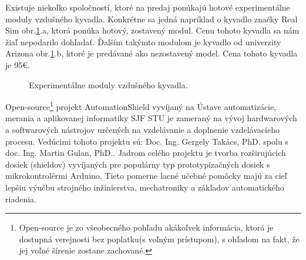 Existuje niekoľko spoločností, ktoré na predaj ponúkajú hotové experimentálne moduly vzdušného kyvadla. Konkrétne sa jedná napríklad o kyvadlo značky Real Sim obr.\ref{OBRAZOK 1.2}.a, ktorá ponúka hotový, zostavený modul. Cenu tohoto kyvadla sa nám žiaľ nepodarilo dohľadať. Ďalším takýmto modulom je kyvadlo od univerzity Arizona\cite{enikov_campa_2012} obr.\ref{OBRAZOK 1.2}.b, ktoré je predávané ako nezostavený model. Cena tohoto kyvadla je 95\euro. 

\begin{figure}[!tbh]
	\hfill
	\hfill
	\hfill
	\caption{Experimentálne moduly vzdušného kyvadla.}\label{OBRAZOK 1.2}
\end{figure}

\newpage
Open-source\footnote[1]{Open-source je zo všeobecného pohľadu akákoľvek informácia, ktorá je dostupná verejnosti bez poplatku(s voľným prístupom), s ohľadom na fakt, že jej voľné šírenie zostane zachované.} projekt AutomationShield vyvíjaný na Ústave automatizácie, merania a aplikovanej informatiky SJF STU je zameraný na vývoj hardwarových a softwarových nástrojov určených na vzdelávanie a doplnenie vzdelávacieho procesu. Vedúcimi tohoto projektu sú: Doc. Ing. Gergely Takács, PhD.\cite{TAKACS} spolu s doc. Ing. Martin Gulan, PhD.\cite{GULANn}. Jadrom celého projektu je tvorba rozširujúcich dosiek (shieldov) vyvíjaných pre populárny typ prototypizačných dosiek s mikrokontrolérmi Arduino. Tieto pomerne lacné učebné pomôcky majú za cieľ lepšiu výučbu strojného inžinierstva, mechatroniky a základov automatického riadenia\cite{Auto}.

